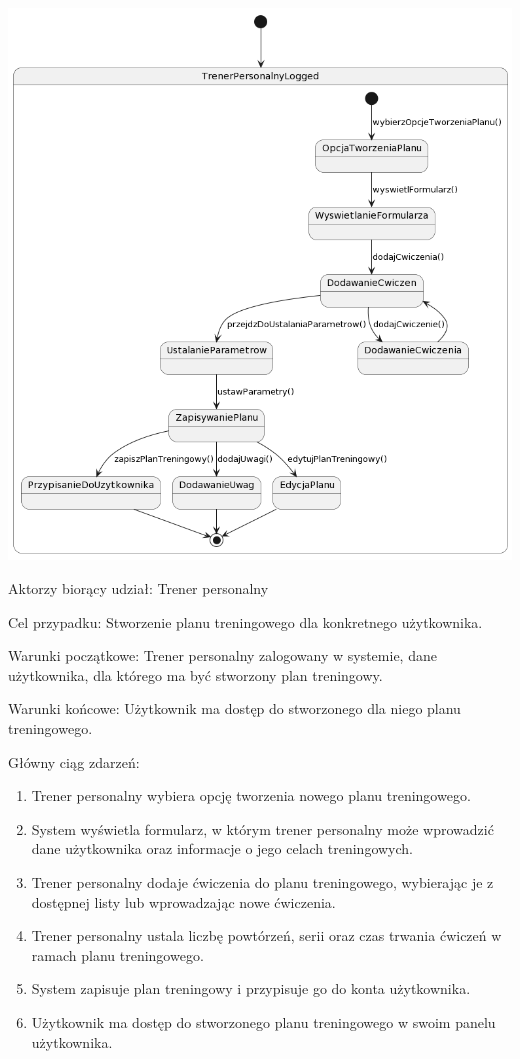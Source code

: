 \documentclass[
]{article}
\providecommand{\tightlist}{%
  \setlength{\itemsep}{0pt}\setlength{\parskip}{0pt}}
\begin{document}
{\includegraphics{diagrams/state/tworzenie_planu_treningu.png}}

{}

{Aktorzy biorący udział: Trener personalny}

{Cel przypadku: Stworzenie planu treningowego dla konkretnego
użytkownika.}

{Warunki początkowe: Trener personalny zalogowany w systemie, dane
użytkownika, dla którego ma być stworzony plan treningowy.}

{Warunki końcowe: Użytkownik ma dostęp do stworzonego dla niego planu
treningowego.}

{Główny ciąg zdarzeń:}

\begin{enumerate}
\tightlist
\item
  {Trener personalny wybiera opcję tworzenia nowego planu treningowego.}
\item
  {System wyświetla formularz, w którym trener personalny może
  wprowadzić dane użytkownika oraz informacje o jego celach
  treningowych.}
\item
  {Trener personalny dodaje ćwiczenia do planu treningowego, wybierając
  je z dostępnej listy lub wprowadzając nowe ćwiczenia.}
\item
  {Trener personalny ustala liczbę powtórzeń, serii oraz czas trwania
  ćwiczeń w ramach planu treningowego.}
\item
  {System zapisuje plan treningowy i przypisuje go do konta
  użytkownika.}
\item
  {Użytkownik ma dostęp do stworzonego planu treningowego w swoim panelu
  użytkownika.}
\end{enumerate}
\end{document}
